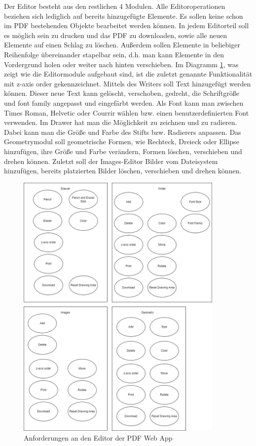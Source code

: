 Der Editor besteht aus den restlichen 4 Modulen. Alle Editoroperationen beziehen sich lediglich auf bereits hinzugefügte Elemente. Es sollen keine schon im PDF bestehenden Objekte bearbeitet werden können. In jedem Editorteil soll es möglich sein zu drucken und das PDF zu downloaden, sowie alle neuen Elemente auf einen Schlag zu löschen. Außerdem sollen Elemente in beliebiger Reihenfolge übereinander stapelbar sein, d.h. man kann Elemente in den Vordergrund holen oder weiter nach hinten verschieben. Im Diagramm \ref{fig:editor}, was zeigt wie die Editormodule aufgebaut sind, ist die zuletzt genannte Funktionalität mit z-axis order gekennzeichnet. Mittels des Writers soll Text hinzugefügt werden können. Dieser neue Text kann gelöscht, verschoben, gedreht, die Schriftgröße und font family angepasst und eingefärbt werden. Als Font kann man zwischen Times Roman, Helvetic oder Courrir wählen bzw. einen benutzerdefinierten Font verwenden. Im Drawer hat man die Möglichkeit zu zeichnen und zu radieren. Dabei kann man die Größe und Farbe des Stifts bzw. Radierers anpassen. Das Geometrymodul soll geometrische Formen, wie Rechteck, Dreieck oder Ellipse hinzufügen, ihre Größe und Farbe verändern, Formen löschen, verschieben und drehen können. Zuletzt soll der Images-Editor Bilder vom Dateisystem hinzufügen, bereits platzierten Bilder löschen, verschieben und drehen können.


\begin{figure}[!htbp]
	\centering
	\includegraphics[width=0.9\textwidth]{"images/editor-funktionen-anforderungen.png"}
	\caption{Anforderungen an den Editor der PDF Web App}
	\label{fig:editor}
\end{figure}


